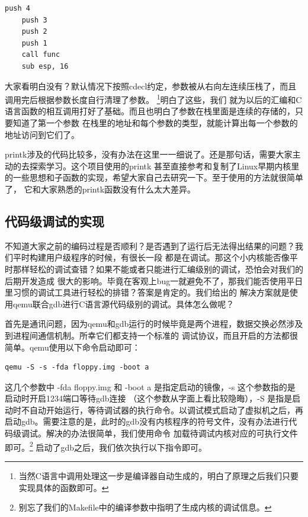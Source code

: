 \begin{lstlisting}[language = {[x86masm]Assembler}, label = 函数调用, caption = 函数调用]
	push 4
	push 3
	push 2
	push 1
	call func
	sub esp, 16
\end{lstlisting}

\par 大家看明白没有？默认情况下按照cdecl约定，参数被从右向左连续压栈了，而且调用完后根据参数长度自行清理了参数。\allowbreak
\footnote{当然C语言中调用处理这一步是编译器自动生成的，明白了原理之后我们只要实现具体的函数即可。}明白了这些，我们\allowbreak
就为以后的汇编和C语言函数的相互调用打好了基础。而且也明白了参数在栈里面是连续的存储的，只要知道了第一个参数\allowbreak
在栈里的地址和每个参数的类型，就能计算出每一个参数的地址访问到它们了。

\par printk涉及的代码比较多，没有办法在这里一一细说了。还是那句话，需要大家主动的去探索学习。这个项目使用的printk\allowbreak
甚至直接参考和复制了Linux早期内核里的一些思想和子函数的实现，希望大家自己去研究一下。至于使用的方法就很简单了，\allowbreak
它和大家熟悉的printk函数没有什么太大差异。

\subsection{代码级调试的实现}

\par 不知道大家之前的编码过程是否顺利？是否遇到了运行后无法得出结果的问题？我们平时构建用户级程序的时候，有很长一段\allowbreak
都是在调试。那这个小内核能否像平时那样轻松的调试查错？如果不能或者只能进行汇编级别的调试，恐怕会对我们的后期开发造成\allowbreak
很大的影响。毕竟在客观上bug一就避免不了，那我们能否使用平日里习惯的调试工具进行轻松的排错？答案是肯定的。我们给出的\allowbreak
解决方案就是使用qemu联合gdb进行C语言源代码级别的调试。具体怎么做呢？

\par 首先是通讯问题，因为qemu和gdb运行的时候毕竟是两个进程，数据交换必然涉及到进程间通信机制。所幸它们都支持一个标准的\allowbreak
调试协议，而且开启的方法都很简单。qemu使用以下命令启动即可：

\begin{Verbatim}[frame=single]
  qemu -S -s -fda floppy.img -boot a 
\end{Verbatim}

\par 这几个参数中 -fda floppy.img 和 -boot a 是指定启动的镜像，-s 这个参数指的是启动时开启1234端口等待gdb连接\allowbreak
（这个参数从字面上看比较隐晦），-S 是指是启动时不自动开始运行，等待调试器的执行命令。以调试模式启动了虚拟机之后，再\allowbreak
启动gdb。需要注意的是，此时的gdb没有内核程序的符号文件，没有办法进行代码级调试。解决的办法很简单，我们使用命令\allowbreak
加载待调试内核对应的可执行文件即可。\footnote{别忘了我们的Makefile中的编译参数中指明了生成内核的调试信息。}\allowbreak
启动了gdb之后，我们依次执行以下指令即可。

